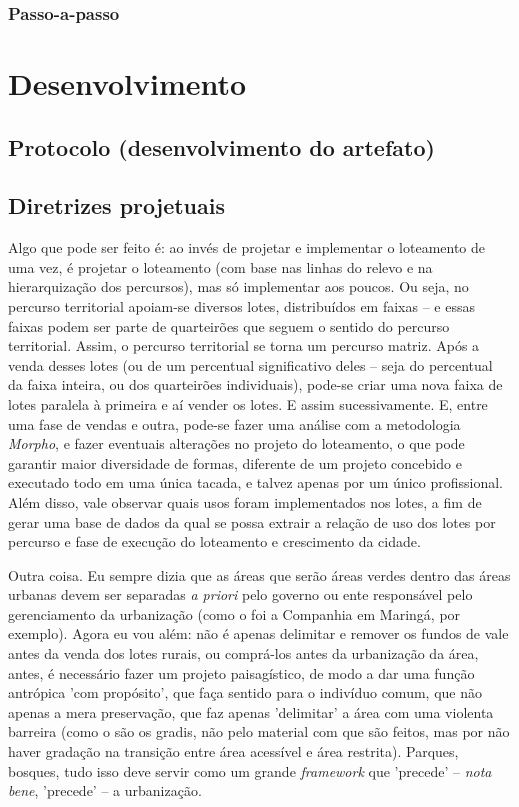 \documentclass[]{report}
\begin{document}
\section{Passo-a-passo}

\part[Desenvolvimento]{Desenvolvimento}
	
	\chapter{Protocolo (desenvolvimento do artefato)}
	\chapter{Diretrizes projetuais}
	
	Algo que pode ser feito é: ao invés de projetar e implementar o loteamento de uma vez, é projetar o loteamento (com base nas linhas do relevo e na hierarquização dos percursos), mas só implementar aos poucos. Ou seja, no percurso territorial apoiam-se diversos lotes, distribuídos em faixas – e essas faixas podem ser parte de quarteirões que seguem o sentido do percurso territorial. Assim, o percurso territorial se torna um percurso matriz. Após a venda desses lotes (ou de um percentual significativo deles – seja do percentual da faixa inteira, ou dos quarteirões individuais), pode-se criar uma nova faixa de lotes paralela à primeira e aí vender os lotes. E assim sucessivamente. E, entre uma fase de vendas e outra, pode-se fazer uma análise com a metodologia \textit{Morpho}, e fazer eventuais alterações no projeto do loteamento, o que pode garantir maior diversidade de formas, diferente de um projeto concebido e executado todo em uma única tacada, e talvez apenas por um único profissional. Além disso, vale observar quais usos foram implementados nos lotes, a fim de gerar uma base de dados da qual se possa extrair a relação de uso dos lotes por percurso e fase de execução do loteamento e crescimento da cidade.

	Outra coisa. Eu sempre dizia que as áreas que serão áreas verdes dentro das áreas urbanas devem ser separadas \textit{a priori} pelo governo ou ente responsável pelo gerenciamento da urbanização (como o foi a Companhia em Maringá, por exemplo). Agora eu vou além: não é apenas delimitar e remover os fundos de vale antes da venda dos lotes rurais, ou comprá-los antes da urbanização da área, antes, é necessário fazer um projeto paisagístico, de modo a dar uma função antrópica 'com propósito', que faça sentido para o indivíduo comum, que não apenas a mera preservação, que faz apenas 'delimitar' a área com uma violenta barreira (como o são os gradis, não pelo material com que são feitos, mas por não haver gradação na transição entre área acessível e área restrita). Parques, bosques, tudo isso deve servir como um grande \textit{framework} que 'precede' – \textit{nota bene}, 'precede' – a urbanização.
\end{document}
